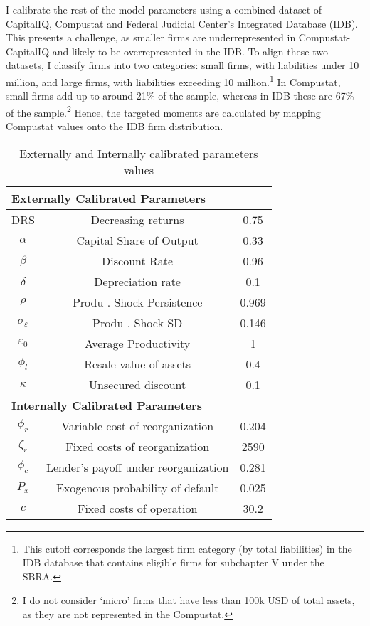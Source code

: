 \documentclass[12pt]{article}
\begin{document}
I calibrate the rest of the model parameters using a combined dataset of CapitalIQ, Compustat and Federal Judicial Center's Integrated Database (IDB). This presents a challenge, as smaller firms are underrepresented in Compustat-CapitalIQ and likely to be overrepresented in the IDB. To align these two datasets, I classify firms into two categories: small firms, with liabilities under 10 million, and large firms, with liabilities exceeding 10 million.\footnote{This cutoff corresponds the largest firm category (by total liabilities) in the IDB database that contains eligible firms for subchapter V under the SBRA.} In Compustat, small firms add up to around 21\% of the sample, whereas in IDB these are 67\% of the sample.\footnote{I do not consider `micro' firms that have less than 100k USD of total assets, as they are not represented in the Compustat.} Hence, the targeted moments are calculated by mapping Compustat values onto the IDB firm distribution.

\begin{table}[h!]
    \centering
    \begin{tabular}{c|c|c}
    \multicolumn{3}{l}{\textbf{Externally Calibrated Parameters}} \\ 
    \midrule
    DRS & Decreasing returns & 0.75 \\
    $\alpha$ & Capital Share of Output & 0.33 \\
    $\beta$ & Discount Rate & 0.96 \\
    $\delta$ & Depreciation rate & 0.1 \\
    $\rho$ & Produ . Shock Persistence & 0.969 \\
    $\sigma_{\varepsilon}$ & Produ . Shock SD & 0.146 \\
    $\varepsilon_0$ & Average Productivity & 1 \\
    $\phi_l$ & Resale value of assets & 0.4 \\
    $\kappa$ & Unsecured discount & 0.1 \vspace{3mm} \\
    \multicolumn{3}{l}{\textbf{Internally Calibrated Parameters}} \\ 
    \midrule
    $\phi_r$ & Variable cost of reorganization & 0.204 \\
    $\zeta_r$ & Fixed costs of reorganization & 2590 \\
    $ \phi_c $ & Lender's payoff under reorganization  & 0.281 \\
    $P_x$ & Exogenous probability of default & 0.025 \\
    $ c $ & Fixed costs of operation & 30.2 \\
    \bottomrule
    \end{tabular}
    \caption{Externally and Internally calibrated parameters values}
    \label{tab:external calib}
\end{table}
\end{document}
